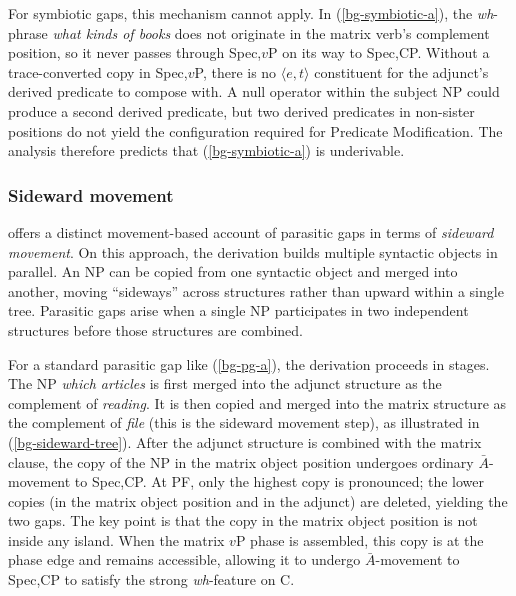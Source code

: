 \documentclass[12pt]{article}
\begin{document}
\ex\label{bg-pm-tree}
\begin{center}
%
\end{center}
\xe

\noindent For symbiotic gaps, this mechanism cannot apply. In (\ref{bg-symbiotic-a}), the \emph{wh}-phrase \emph{what kinds of books} does not originate in the matrix verb's complement position, so it never passes through Spec,$v$P on its way to Spec,CP. Without a trace-converted copy in Spec,$v$P, there is no $\langle e,t \rangle$ constituent for the adjunct's derived predicate to compose with. A null operator within the subject NP could produce a second derived predicate, but two derived predicates in non-sister positions do not yield the configuration required for Predicate Modification. The analysis therefore predicts that (\ref{bg-symbiotic-a}) is underivable.

\subsubsection{Sideward movement}\label{sec:sideward}

\citet{nunes2004} offers a distinct movement-based account of parasitic gaps in terms of \emph{sideward movement}. On this approach, the derivation builds multiple syntactic objects in parallel. An NP can be copied from one syntactic object and merged into another, moving ``sideways'' across structures rather than upward within a single tree. Parasitic gaps arise when a single NP participates in two independent structures before those structures are combined.

For a standard parasitic gap like (\ref{bg-pg-a}), the derivation proceeds in stages. The NP \emph{which articles} is first merged into the adjunct structure as the complement of \emph{reading}. It is then copied and merged into the matrix structure as the complement of \emph{file} (this is the sideward movement step), as illustrated in (\ref{bg-sideward-tree}). After the adjunct structure is combined with the matrix clause, the copy of the NP in the matrix object position undergoes ordinary $\bar{A}$-movement to Spec,CP. At PF, only the highest copy is pronounced; the lower copies (in the matrix object position and in the adjunct) are deleted, yielding the two gaps. The key point is that the copy in the matrix object position is not inside any island. When the matrix $v$P phase is assembled, this copy is at the phase edge and remains accessible, allowing it to undergo $\bar{A}$-movement to Spec,CP to satisfy the strong \emph{wh}-feature on C.
\end{document}
